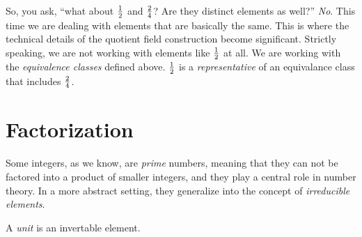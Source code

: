 So, you ask, ``what about $1\over2$ and $2\over4$?  Are they distinct
elements as well?''  {\it No}.  This time we are dealing with elements
that are basically the same. This is where the technical details of
the quotient field construction become significant.  Strictly
speaking, we are not working with elements like $1\over2$ at all.  We
are working with the {\it equivalence classes} defined above.
$1\over2$ is a {\it representative} of an equivalance class that
includes $2\over4$.

\begin{comment}

If all this seems a bit arbitrary, well, it is.  I could easily pick
two numbers from {\bf Z} and pair them into equivalence classes in
some other way than for {\bf Q}; if my basic axioms were satisified I
would even have a field!  Whether it would be useful for something
other than puzzling the few readers who would bother is a different
story.  Let me briefly cite a few other examples of {\it useful}
equivalence classes.  Take pairs of elements from a field $f$ and $g$
in the expression $f\,dg$ and form equivalence classes based on
whether the expression can be transformed to $f'\,dg'$; this is one
way to introduce differentials into an algebraic context.  Take points
in a Cartesian geometry $(x_1, x_2,\ldots x_n)$ and group them
together if they are related by a simple constant multiple $(\lambda
x_1, \lambda x_2,\ldots \lambda x_n)$; you now have lines through the
origin and the basis for projective geometry.  Take infinite
convergent sequences of rational numbers (from {\bf Q}) and group them
together if the differences between them converge to zero; the
equivalence classes are the real numbers.  I could keep going.  These
constructions are easy to form; their utility lies in our ability to
relate them to real world problems.

\end{comment}

\vfill\eject

\section{Factorization}

Some integers, as we know, are {\it prime} numbers, meaning that they
can not be factored into a product of smaller integers, and they play
a central role in number theory.  In a more abstract setting, they
generalize into the concept of {\it irreducible elements}.

\begin{key point}
A {\it unit} is an invertable element.
\end{key point}

